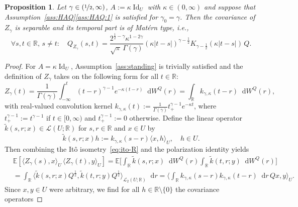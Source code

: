 \documentclass[reqno]{amsart}
\numberwithin{equation}{section}
\newcommand{\bbR}{\mathbb{R}}
\newcommand{\R}{\mathbb{R}}
\newcommand{\E}{\mathbb{E}}
\newcommand{\scalar}[2]{     \langle #1       \rangle_{ #2 }}
\newcommand{\rd}{\mathop{}\!\mathrm{d}}
\newcommand{\id}{\operatorname{Id}}
\newcommand{\LO}{\mathscr L}
\newtheorem{proposition}[lemma]{Proposition}
\theoremstyle{remark}
\theoremstyle{definition}
\begin{document}
\begin{proposition}\label{prop:separable-cov-matern}
	Let $\gamma \in (\nicefrac{1}{2}, \infty)$, $A := \kappa \id_{U}$ with ${\kappa \in (0,\infty)}$ and
	suppose that
	Assumption~\textup{\ref{ass:HAQ}\ref{ass:HAQ:1}} is satisfied for $\gamma_0 = \gamma$.
	Then the covariance of $Z_\gamma$ is 
	separable and its temporal part 
	is of Matérn type, 
	i.e.,
	\begin{equation}
		\forall s, t \in \bbR, \, s \neq t : \quad
		Q_{Z_\gamma}(s,t) 
		=
		\frac{2^{\frac{1}{2}-\gamma}\kappa^{1-2\gamma}}
		{\sqrt{\pi}\,\Gamma(\gamma)}
		(\kappa |t-s|)^{\gamma-\frac{1}{2}} 
		K_{\gamma-\frac{1}{2}}(\kappa |t-s|)
		\, Q.
		\label{eq:temporal-asymp-matern-Q}  
	\end{equation}
\end{proposition}
%
\begin{proof}
	For $A = \kappa \id_{U}$, Assumption~\ref{ass:standing} is trivially satisfied and
	the definition of $Z_\gamma$ takes on the following form for all $t \in \R$:
	\begin{equation}
		Z_\gamma(t) 
		= 
		\frac{1}{\Gamma(\gamma)} \int_{-\infty}^t (t-r)^{\gamma-1} e^{-\kappa(t-r)} \rd W^Q(r)
		=
		\int_\R k_{\gamma, \kappa}(t-r) \rd W^Q(r),
	\end{equation}
	with real-valued convolution kernel 
	$k_{\gamma, \kappa}(t) := \frac{1}{\Gamma(\gamma)}t^{\gamma-1}_+ e^{-\kappa t}$,
	where $t_+^{\gamma-1} := t^{\gamma - 1}$ if $t \in [0,\infty)$ and $t_+^{\gamma-1} := 0$ otherwise.
	Define the linear operator $\widetilde k(s, r; x) \in \LO(U; \bbR)$
	for $s, r \in \R$ and $x \in U$
	by 
	\[
	\widetilde k(s, r; x) h := k_{\gamma,\kappa}(s - r) \scalar{x, h}{U}, \quad h \in U.
	\]
	Then combining the It\^o isometry~\eqref{eq:ito-R} and the polarization identity yields
	\[ 
	\begin{aligned}
		&\E[ \scalar{Z_\gamma(s), x}{U} \, \scalar{Z_\gamma(t), y}{U} ]
		=
		\E\biggl[\int_\bbR \widetilde k(s,r; x) \rd W^Q(r) \int_\bbR \widetilde k(t,r; y) \rd W^Q(r) \biggr]
		\\
		&=
		\int_\bbR \scalar{\widetilde k(s,r; x) Q^\frac{1}{2},  \widetilde k(t,r;y)Q^\frac{1}{2}}{\LO_2(U; \R)} \rd r
		=
		\biggl\langle 
		\int_\bbR k_{\gamma,\kappa}(s-r) k_{\gamma,\kappa}(t-r) \rd r \, Qx, y\biggr\rangle_U. 
	\end{aligned}
	\] 
	Since $x, y \in U$ were arbitrary, 
	we find
	for all $h \in \R \setminus \{0\}$ the covariance operators

\end{proof}
\end{document}
